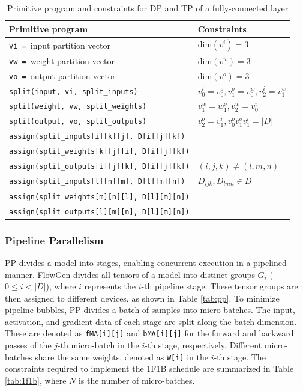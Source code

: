 \begin{table}[h]
\centering
\footnotesize
\begin{tabular}{l|l}
\textbf{Primitive program} & \textbf{Constraints} \\
\hline
\texttt{vi = }input partition vector & $\mathrm{dim}(v^i) = 3$ \\ 
\texttt{vw = }weight partition vector & $\mathrm{dim}(v^w) = 3$ \\
\texttt{vo = }output partition vector & $\mathrm{dim}(v^o) = 3$ \\
\hline
\texttt{split(input, vi, split\_inputs)} & $v^i_0 = v^o_0, v^o_1 = v^w_0, v^i_2 = v^w_1$ \\
\texttt{split(weight, vw, split\_weights)} & $v^w_1 = w^o_1, v^w_2 = v^i_0$ \\
\texttt{split(output, vo, split\_outputs)} & $v^o_2 = v^i_1, v^o_0v^o_1v^i_1 = |D|$ \\
\hline
\texttt{assign(split\_inputs[i][k][j], D[i][j][k])} & \\
\texttt{assign(split\_weights[k][j][i], D[i][j][k])} & \\
\texttt{assign(split\_outputs[i][j][k], D[i][j][k])} & $(i, j, k) \neq (l, m, n)$ \\
\texttt{assign(split\_inputs[l][n][m], D[l][m][n])} & $D_{ijk}, D_{lmn} \in D$ \\
\texttt{assign(split\_weights[m][n][l], D[l][m][n])} & \\
\texttt{assign(split\_outputs[l][m][n], D[l][m][n])} & \\
\hline
\end{tabular}
\caption{Primitive program and constraints for DP and TP of a fully-connected layer}
\label{tab:dp_tp}
\end{table}

\subsubsection{Pipeline Parallelism}

PP divides a model into stages, enabling concurrent execution in a pipelined manner. FlowGen divides all tensors of a model into distinct groups $G_i$ ($0 \leq i < |D|$), where $i$ represents the $i$-th pipeline stage. These tensor groups are then assigned to different devices, as shown in Table \ref{tab:pp}. To minimize pipeline bubbles, PP divides a batch of samples into micro-batches. The input, activation, and gradient data of each stage are split along the batch dimension. These are denoted as \texttt{fMA[i][j]} and \texttt{bMA[i][j]} for the forward and backward passes of the $j$-th micro-batch in the $i$-th stage, respectively. Different micro-batches share the same weights, denoted as \texttt{W[i]} in the $i$-th stage. The constraints required to implement the 1F1B\cite{huang2019gpipe} schedule are summarized in Table \ref{tab:1f1b}, where $N$ is the number of micro-batches.

